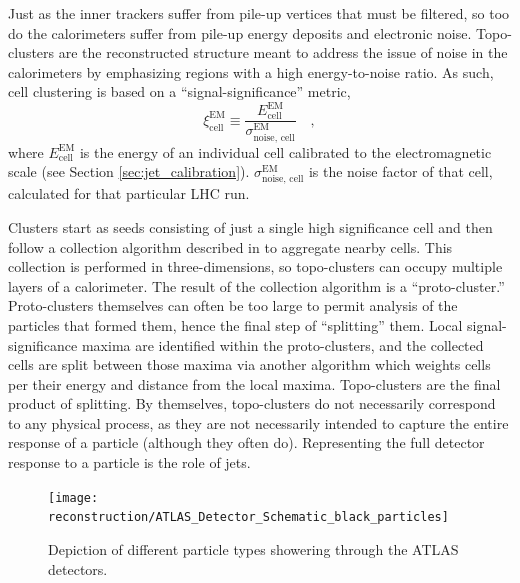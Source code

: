         Just as the inner trackers suffer from pile-up vertices that must be filtered,
            so too do the calorimeters suffer from pile-up energy deposits and electronic noise.
        Topo-clusters are the reconstructed structure meant to address the issue of noise in the calorimeters
            by emphasizing regions with a high energy-to-noise ratio.
        As such, cell clustering is based on a ``signal-significance'' metric,
        \begin{equation}
            \xi^{\textrm{EM}}_{\textrm{cell}} \equiv \frac{
                E^{\textrm{EM}}_{\textrm{cell}} }{
                \sigma^{\textrm{EM}}_{\textrm{noise, cell}} } \quad,
        \end{equation}
            where $E^{\textrm{EM}}_{\textrm{cell}}$ is the energy of an individual cell calibrated to the electromagnetic scale
            (see Section \ref{sec:jet_calibration}).
        $\sigma^{\textrm{EM}}_{\textrm{noise, cell}}$ is the noise factor of that cell, calculated for that particular LHC run.

        Clusters start as seeds consisting of just a single high significance cell
            and then follow a collection algorithm described in \cite{cell_clustering} to aggregate nearby cells.
        This collection is performed in three-dimensions, so topo-clusters can occupy multiple layers of a calorimeter.
        The result of the collection algorithm is a ``proto-cluster.''
        Proto-clusters themselves can often be too large to permit analysis of the particles that formed them,
            hence the final step of ``splitting'' them.
        Local signal-significance maxima are identified within the proto-clusters,
            and the collected cells are split between those maxima via another algorithm
            which weights cells per their energy and distance from the local maxima.
        Topo-clusters are the final product of splitting.
        By themselves, topo-clusters do not necessarily correspond to any physical process,
            as they are not necessarily intended to capture the entire response of a particle
            (although they often do).
        Representing the full detector response to a particle is the role of jets.

        \begin{figure}[tbh]
            \texttt{[image: reconstruction/ATLAS\_Detector\_Schematic\_black\_particles]}
            \caption{
                Depiction of different particle types showering through the ATLAS detectors\cite{Mehlhase:2770815}.
            }
            \label{fig:atlas_shower}
        \end{figure}


